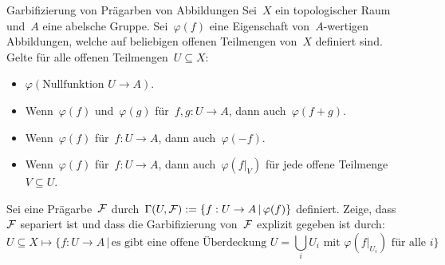 \documentclass{uebblatt}
\begin{document}
\begin{aufgabe}{Garbifizierung von Prägarben von Abbildungen}
Sei~$X$ ein topologischer Raum und~$A$ eine abelsche Gruppe. Sei~$\varphi(f)$
eine Eigenschaft von~$A$-wertigen Abbildungen, welche auf beliebigen offenen
Teilmengen von~$X$ definiert sind. Gelte für alle offenen Teilmengen~$U
\subseteq X$:
\begin{itemize}
\item $\varphi(\text{Nullfunktion~$U \to A$})$.
\item Wenn~$\varphi(f)$ und~$\varphi(g)$ für~$f,g:U \to A$, dann auch~$\varphi(f+g)$.
\item Wenn~$\varphi(f)$ für~$f:U \to A$, dann auch~$\varphi(-f)$.
\item Wenn~$\varphi(f)$ für~$f:U \to A$, dann auch~$\varphi(f|_V)$ für jede
offene Teilmenge~$V \subseteq U$.
\end{itemize}
Sei eine Prägarbe~$\mathcal{F}$ durch~$\Gamma(U,\mathcal{F}) := \{ f : U \to A \,|\, \varphi(f)
\}$ definiert. Zeige, dass~$\mathcal{F}$ separiert ist und dass die Garbifizierung
von~$\mathcal{F}$ explizit gegeben ist durch:
\[ U \subseteq X \longmapsto
  \{ f : U \to A \,|\, \text{es gibt eine offene Überdeckung~$U = \bigcup_i
  U_i$ mit~$\varphi(f|_{U_i})$ für alle~$i$} \} \]
\end{aufgabe}
\end{document}
